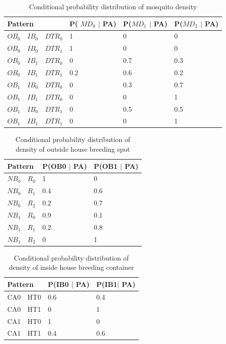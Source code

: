 \documentclass[review]{elsarticle}
\begin{document}
\begin{table}[!htbp]
		\centering
		\normalsize
		\begin{tabular}{|l|l|l|l|l|l|}
			\hline
			\multicolumn{3}{|l|}{Pattern}	 & P( $MD_0$ $\mid$ PA) & P($MD_1$ $\mid$ PA) & P($MD_2$  $\mid$ PA)\\
			\hline
			$OB_0$ & $IB_0$ & $DTR_0$ & 1 & 0 & 0\\
			\hline
			$OB_0$ & $IB_0$ & $DTR_1$ & 1 & 0 & 0\\
			\hline
			$OB_0$ & $IB_1$ & $DTR_0$ & 0 & 0.7 & 0.3\\
			\hline
			$OB_0$ & $IB_1$ & $DTR_1$ & 0.2 & 0.6 & 0.2\\
			\hline
			$OB_1$ & $IB_0$ & $DTR_0$ & 0 & 0.3 & 0.7\\
			\hline
			$OB_1$ & $IB_1$ & $DTR_0$ & 0 & 0 & 1\\
			\hline
			$OB_1$ & $IB_0$ & $DTR_1$ & 0 & 0.5 & 0.5\\
			\hline
			$OB_1$ & $IB_1$ & $DTR_1$ & 0 & 0 & 1\\
			\hline
		\end{tabular}
		\caption{ Conditional probability distribution of mosquito density}
		\label{condition-md}
	\end{table}
	
	
	\begin{table}[!htbp]
		\centering
		\normalsize
		\begin{tabular}{|l|l|l|l|}
			\hline
			\multicolumn{2}{|l|}{Pattern}  & P(OB0 $\mid$ PA) & P(OB1 $\mid$ PA)\\
			\hline
			$NB_0$ & $R_0$ & 1 & 0\\
			\hline
			$NB_0$ & $R_1$ & 0.4 & 0.6\\
			\hline
			$NB_0$ & $R_2$ & 0.2 & 0.7\\
			\hline
			$NB_1$ & $R_0$ & 0.9 & 0.1\\
			\hline
			$NB_1$ & $R_1$ & 0.2 & 0.8\\
			\hline
			$NB_1$ & $R_2$ & 0 & 1\\
			\hline
		\end{tabular}
		\caption{Conditional probability distribution of density of outside house breeding spot}
		\label{condition-ob}
	\end{table}
	
	\begin{table}[!htbp]
		\centering
		\normalsize
		\begin{tabular}{|l|l|l|l|}
			\hline
			\multicolumn{2}{|l|}{Pattern}  & P(IB0 $\mid$ PA) & P(IB1$\mid$ PA)\\
			\hline
			CA0 & HT0 & 0.6 & 0.4\\
			\hline
			CA0 & HT1 & 0 & 1\\
			\hline
			CA1 & HT0 & 1 & 0\\
			\hline
			CA1 & HT1 & 0.4 & 0.6\\
			\hline
		\end{tabular}
		\caption{Conditional probability distribution of density of inside house breeding container}
		\label{condition-ib}
	\end{table}
	
\end{document}
